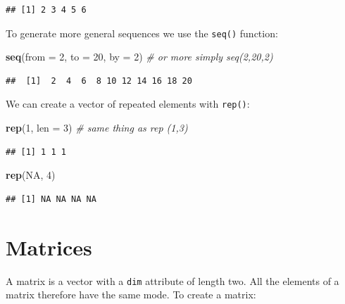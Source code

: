 \documentclass[]{book}
\newenvironment{Shaded}{\begin{snugshade}}{\end{snugshade}}
\newcommand{\CommentTok}[1]{\textcolor[rgb]{0.56,0.35,0.01}{\textit{#1}}}
\newcommand{\DataTypeTok}[1]{\textcolor[rgb]{0.13,0.29,0.53}{#1}}
\newcommand{\DecValTok}[1]{\textcolor[rgb]{0.00,0.00,0.81}{#1}}
\newcommand{\KeywordTok}[1]{\textcolor[rgb]{0.13,0.29,0.53}{\textbf{#1}}}
\newcommand{\NormalTok}[1]{#1}
\newcommand{\OtherTok}[1]{\textcolor[rgb]{0.56,0.35,0.01}{#1}}
\begin{document}
\begin{verbatim}
## [1] 2 3 4 5 6
\end{verbatim}

To generate more general sequences we use the \texttt{seq()} function:

\begin{Shaded}
\begin{Highlighting}[]
\KeywordTok{seq}\NormalTok{(}\DataTypeTok{from =} \DecValTok{2}\NormalTok{, }\DataTypeTok{to =} \DecValTok{20}\NormalTok{, }\DataTypeTok{by =} \DecValTok{2}\NormalTok{) }\CommentTok{# or more simply seq(2,20,2)}
\end{Highlighting}
\end{Shaded}

\begin{verbatim}
##  [1]  2  4  6  8 10 12 14 16 18 20
\end{verbatim}

We can create a vector of repeated elements with \texttt{rep()}:

\begin{Shaded}
\begin{Highlighting}[]
\KeywordTok{rep}\NormalTok{(}\DecValTok{1}\NormalTok{, }\DataTypeTok{len =} \DecValTok{3}\NormalTok{) }\CommentTok{# same thing as rep (1,3)}
\end{Highlighting}
\end{Shaded}

\begin{verbatim}
## [1] 1 1 1
\end{verbatim}

\begin{Shaded}
\begin{Highlighting}[]
\KeywordTok{rep}\NormalTok{(}\OtherTok{NA}\NormalTok{, }\DecValTok{4}\NormalTok{)}
\end{Highlighting}
\end{Shaded}

\begin{verbatim}
## [1] NA NA NA NA
\end{verbatim}

\hypertarget{matrices}{%
\section{Matrices}\label{matrices}}

A matrix is a vector with a \texttt{dim} attribute of length two. All the elements of a matrix therefore have the same mode. To create a matrix:
\end{document}
